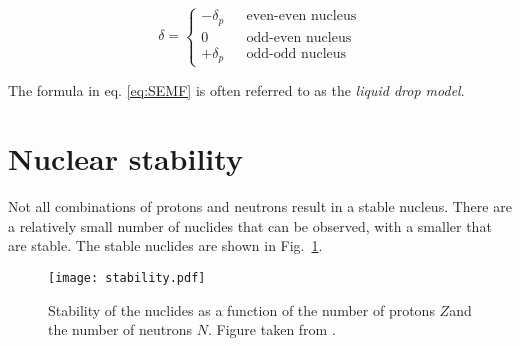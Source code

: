 \begin{description}
\[\delta=\left\{\begin{array}{ccc}
-\delta_p& &\mbox{even-even nucleus}\\
0& &\mbox{odd-even nucleus}\\
+\delta_p& &\mbox{odd-odd nucleus}
\end{array}\right.\]
\end{description}

The formula in eq. \ref{eq:SEMF} is often referred to as the \emph{liquid drop model}. 
\section{Nuclear stability} 
Not all combinations of protons and neutrons result in a stable nucleus. There are a relatively small number of nuclides that can be observed, with a smaller that are stable. The stable nuclides are shown in Fig.~\ref{fig:stability}. 
\begin{figure}
\begin{center}
 \texttt{[image: stability.pdf]}
\end{center}
 \caption{Stability of the nuclides as a function of the number of protons $Z$and the number of neutrons $N$. Figure taken from \cite{nndc}.}\label{fig:stability}
\end{figure}
